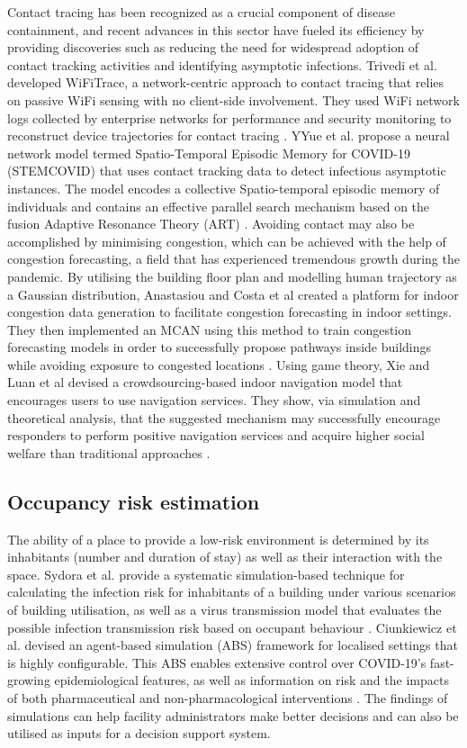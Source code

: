\documentclass[acmtog]{acmart}
\begin{document}
Contact tracing has been recognized as a crucial component of disease containment, and recent advances in this sector have fueled its efficiency by providing discoveries such as reducing the need for widespread adoption of contact tracking activities and identifying asymptotic infections. Trivedi et al. developed WiFiTrace, a network-centric approach to contact tracing that relies on passive WiFi sensing with no client-side involvement. They used WiFi network logs collected by enterprise networks for performance and security monitoring to reconstruct device trajectories for contact tracing \cite{trivedi2021wifitrace}. YYue et al. propose a neural network model termed Spatio-Temporal Episodic Memory for COVID-19 (STEMCOVID) that uses contact tracking data to detect infectious asymptotic instances. The model encodes a collective Spatio-temporal episodic memory of individuals and contains an effective parallel search mechanism based on the fusion Adaptive Resonance Theory (ART) \cite{hu2020silent}. Avoiding contact may also be accomplished by minimising congestion, which can be achieved with the help of congestion forecasting, a field that has experienced tremendous growth during the pandemic. By utilising the building floor plan and modelling human trajectory as a Gaussian distribution, Anastasiou and Costa et al created a platform for indoor congestion data generation to facilitate congestion forecasting in indoor settings. They then implemented an MCAN using this method to train congestion forecasting models in order to successfully propose pathways inside buildings while avoiding exposure to congested locations \cite{anastasiou2021epicgen}. Using game theory, Xie and Luan et al devised a crowdsourcing-based indoor navigation model that encourages users to use navigation services. They show, via simulation and theoretical analysis, that the suggested mechanism may successfully encourage responders to perform positive navigation services and acquire higher social welfare than traditional approaches \cite{xie2021game}.


\subsection{Occupancy risk estimation}
The ability of a place to provide a low-risk environment is determined by its inhabitants (number and duration of stay) as well as their interaction with the space. Sydora et al. provide a systematic simulation-based technique for calculating the infection risk for inhabitants of a building under various scenarios of building utilisation, as well as a virus transmission model that evaluates the possible infection transmission risk based on occupant behaviour \cite{sydora2022building}. Ciunkiewicz et al. devised an agent-based simulation (ABS) framework for localised settings that is highly configurable. This ABS enables extensive control over COVID-19's fast-growing epidemiological features, as well as information on risk and the impacts of both pharmaceutical and non-pharmacological interventions \cite{ciunkiewicz2022agent}. The findings of simulations can help facility administrators make better decisions and can also be utilised as inputs for a decision support system. 
\end{document}
